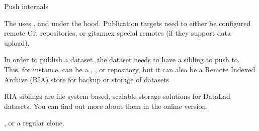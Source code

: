 \ignorespaces \begin{gitusernote}[label={index-1}, before title={\thetcbcounter\ }, check odd page=true]{Push internals}
\label{\detokenize{basics/101-141-push:index-1}}

\sphinxAtStartPar
The  uses , and  under
the hood. Publication targets need to either be configured remote Git repositories,
or git\sphinxhyphen{}annex special remotes (if they support data upload).


\end{gitusernote}

\sphinxAtStartPar
In order to publish a dataset, the dataset needs to have a sibling to push to.
This, for instance, can be a {\hyperref[\detokenize{glossary:term-GitHub}]{}}, {\hyperref[\detokenize{glossary:term-GitLab}]{}}, or {\hyperref[\detokenize{glossary:term-GIN}]{}}
repository, but it can also be a Remote Indexed Archive (RIA) store for backup
or storage of datasets%
\begin{footnote}\sphinxAtStartFootnote
RIA siblings are file system based, scalable storage solutions for
DataLad datasets. You can find out more about them in the online version.
%
\end{footnote}, or a regular clone.

